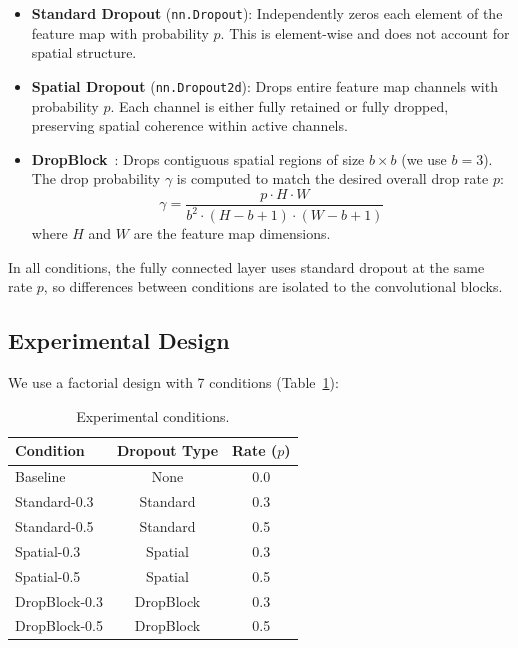 \documentclass[11pt]{article}
\begin{document}
\begin{itemize}
    \item \textbf{Standard Dropout} (\texttt{nn.Dropout}): Independently zeros each element of the feature map with probability $p$. This is element-wise and does not account for spatial structure.
    \item \textbf{Spatial Dropout} (\texttt{nn.Dropout2d}): Drops entire feature map channels with probability $p$. Each channel is either fully retained or fully dropped, preserving spatial coherence within active channels.
    \item \textbf{DropBlock}~\citep{ghiasi2018}: Drops contiguous spatial regions of size $b \times b$ (we use $b{=}3$). The drop probability $\gamma$ is computed to match the desired overall drop rate $p$:
    \begin{equation}
        \gamma = \frac{p \cdot H \cdot W}{b^2 \cdot (H - b + 1) \cdot (W - b + 1)}
    \end{equation}
    where $H$ and $W$ are the feature map dimensions.
\end{itemize}

In all conditions, the fully connected layer uses standard dropout at the same rate $p$, so differences between conditions are isolated to the convolutional blocks.

\subsection{Experimental Design}

We use a factorial design with 7 conditions (Table~\ref{tab:conditions}):

\begin{table}[h]
\centering
\caption{Experimental conditions.}
\label{tab:conditions}
\begin{tabular}{lcc}
\toprule
Condition & Dropout Type & Rate ($p$) \\
\midrule
Baseline & None & 0.0 \\
\midrule
Standard-0.3 & Standard & 0.3 \\
Standard-0.5 & Standard & 0.5 \\
Spatial-0.3 & Spatial & 0.3 \\
Spatial-0.5 & Spatial & 0.5 \\
DropBlock-0.3 & DropBlock & 0.3 \\
DropBlock-0.5 & DropBlock & 0.5 \\
\bottomrule
\end{tabular}
\end{table}
\end{document}
